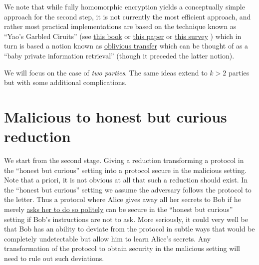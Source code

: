 We note that while fully homomorphic encryption yields a conceptually
simple approach for the second step, it is not currently the most
efficient approach, and rather most practical implementations are based
on the technique known as ``Yao's Garbled Ciruits'' (see
\href{http://u.cs.biu.ac.il/~lindell/efficient-protocols.html}{this
book} or \href{https://eprint.iacr.org/2004/175.pdf}{this paper} or
\href{https://www.cs.uic.edu/pub/Bits/PeterSnyder/Peter_Snyder_-_Garbled_Circuits_WCP_2_column.pdf}{this
survey} ) which in turn is based a notion known as
\href{https://en.wikipedia.org/wiki/Oblivious_transfer}{oblivious
transfer} which can be thought of as a ``baby private information
retrieval'' (though it preceded the latter notion).

We will focus on the case of \emph{two parties}. The same ideas extend
to \(k>2\) parties but with some additional complications.

\section{Malicious to honest but curious
reduction}\label{Malicious-to-honest-but-curiou}

We start from the second stage. Giving a reduction transforming a
protocol in the ``honest but curious'' setting into a protocol secure in
the malicious setting. Note that a priori, it is not obvious at all that
such a reduction should exist. In the ``honest but curious'' setting we
assume the adversary follows the protocol to the letter. Thus a protocol
where Alice gives away all her secrets to Bob if he merely
\href{https://xkcd.com/424/}{asks her to do so politely} can be secure
in the ``honest but curious'' setting if Bob's instructions are not to
ask. More seriously, it could very well be that Bob has an ability to
deviate from the protocol in subtle ways that would be completely
undetectable but allow him to learn Alice's secrets. Any transformation
of the protocol to obtain security in the malicious setting will need to
rule out such deviations.

